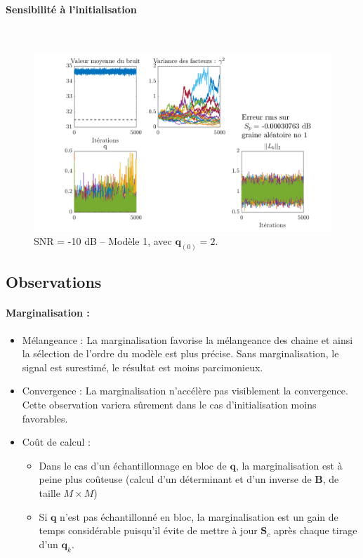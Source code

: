 \documentclass[ 12pt]{article}
\begin{document}
\paragraph{Sensibilité à l’initialisation} ~\\
\begin{figure}[H]
	\centering
	\includegraphics[width=\textwidth]{ToyCase/modele1_ini2_snrm10db.png}	
	\caption{SNR = -10 dB  -- Modèle 1, avec $\bm{q}_{(0)}=2$.}
\end{figure}

\subsection{Observations}
\paragraph{Marginalisation :} 
\begin{itemize}
	\item Mélangeance : La marginalisation favorise la mélangeance des chaine et ainsi la sélection de l'ordre du modèle est plus précise. Sans marginalisation, le signal est surestimé, le résultat est moins parcimonieux.
	\item Convergence : La marginalisation n'accélère pas visiblement la convergence. Cette observation  variera sûrement dans le cas d'initialisation moins favorables. 
        \item Coût de calcul : 
        \begin{itemize}
	        \item Dans le cas d'un échantillonnage en bloc de $\bm{q}$, la marginalisation est à peine plus coûteuse (calcul d'un déterminant et d'un inverse de $\bm{B}$, de taille $M\times M$) 
		\item Si $\bm{q}$ n'est pas échantillonné en bloc, la marginalisation est un gain de temps considérable puisqu'il évite de mettre à jour $\bm{S}_c$ après chaque tirage d'un $\bm{q}_k$.
	\end{itemize}       
\end{itemize}
\end{document}
